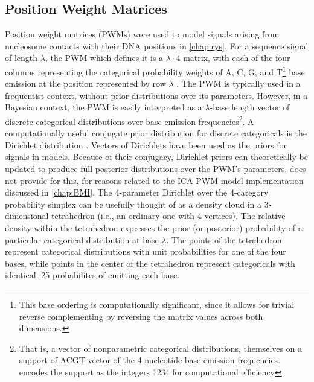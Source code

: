 \documentclass{ut-thesis}
\begin{document}
\begin{NoHyper}
\subsection{Position Weight Matrices}
\label{ssec:PWM}
Position weight matrices (PWMs) were used to model signals arising from nucleosome contacts with their DNA positions in \autoref{chap:rys}. For a sequence signal of length $\lambda$, the PWM which defines it is a $\lambda \cdot 4$ matrix, with each of the four columns representing the categorical probability weights of A, C, G, and T\footnote{This base ordering is computationally significant, since it allows for trivial reverse complementing by reversing the matrix values across both dimensions.} base emission at the position represented by row $\lambda$ \cite{Stormo1982}. The PWM is typically used in a frequentist context, without prior distributions over its parameters. However, in a Bayesian context, the PWM is easily interpreted as a $\lambda$-base length vector of discrete categorical distributions over base emission frequencies\footnote{That is, a vector of nonparametric categorical distributions, themselves on a support of ACGT vector of the 4 nucleotide base emission frequencies.  encodes the support as the integers 1234 for computational efficiency}. A computationally useful conjugate prior distribution for discrete categoricals is the Dirichlet distribution \cite{Minka2000}. Vectors of Dirichlets have been used as the priors for signals in  models. Because of their conjugacy, Dirichlet priors can theoretically be updated to produce full posterior distributions over the PWM's parameters.  does not provide for this, for reasons related to the ICA PWM model implementation discussed in \autoref{chap:BMI}. The 4-parameter Dirichlet over the 4-category probability simplex can be usefully thought of as a density cloud in a 3-dimensional tetrahedron (i.e., an ordinary one with 4 vertices). The relative density within the tetrahedron expresses the prior (or posterior) probability of a particular categorical distribution at base $\lambda$. The points of the tetrahedron represent categorical distributions with unit probabilities for one of the four bases, while points in the center of the tetrahedron represent categoricals with identical .25 probabilites of emitting each base. 


\end{NoHyper}
\end{document}
